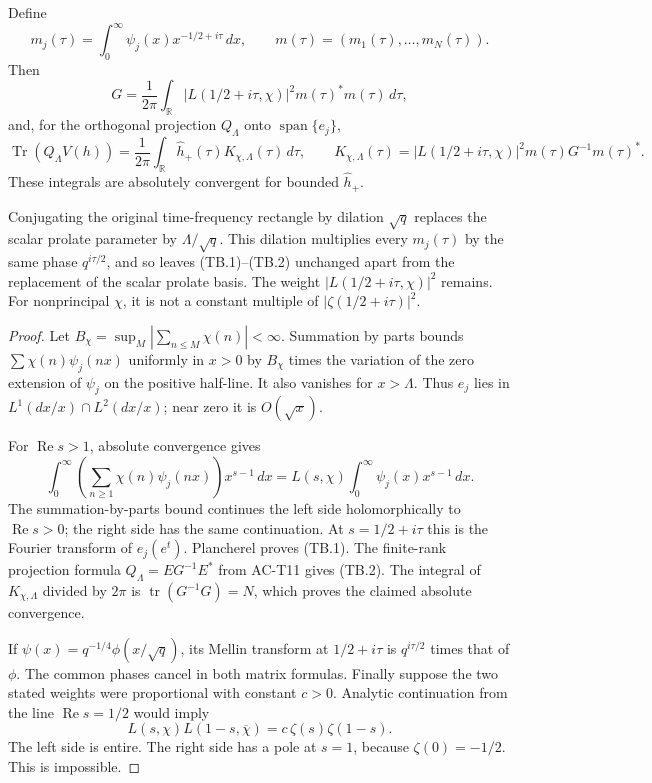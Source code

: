 \begin{proposition}
\label{AC-T21}
Define
\[
 m_j(\tau)=\int_0^\infty
       \psi_j(x)x^{-1/2+i\tau}\,dx,\qquad
 m(\tau)=(m_1(\tau),\ldots,m_N(\tau)).
\]
Then
\[
 G=\frac1{2\pi}\int_{\mathbb R}
      |L(1/2+i\tau,\chi)|^2 m(\tau)^*m(\tau)\,d\tau,
 \tag{TB.1}
\]
and, for the orthogonal projection \(Q_\Lambda\) onto
\(\operatorname{span}\{e_j\}\),
\[
 \operatorname{Tr}(Q_\Lambda V(h))
   =\frac1{2\pi}\int_{\mathbb R}\widehat h_+(\tau)
       K_{\chi,\Lambda}(\tau)\,d\tau,\qquad
 K_{\chi,\Lambda}(\tau)=
 |L(1/2+i\tau,\chi)|^2
           m(\tau)G^{-1}m(\tau)^* .
 \tag{TB.2}
\]
These integrals are absolutely convergent for bounded
\(\widehat h_+\).

Conjugating the original time-frequency rectangle by dilation
\(\sqrt q\) replaces the scalar prolate parameter by
\(\Lambda/\sqrt q\).  This dilation multiplies every \(m_j(\tau)\)
by the same phase \(q^{i\tau/2}\), and so leaves (TB.1)--(TB.2)
unchanged apart from the replacement of the scalar prolate basis.
The weight \(|L(1/2+i\tau,\chi)|^2\) remains.
For nonprincipal \(\chi\), it is not a constant multiple of
\(|\zeta(1/2+i\tau)|^2\).
\end{proposition}
\begin{proof}
Let \(B_\chi=\sup_M|\sum_{n\leq M}\chi(n)|<\infty\).
Summation by parts bounds
\(\sum\chi(n)\psi_j(nx)\) uniformly in \(x>0\) by
\(B_\chi\) times the variation of the zero extension of
\(\psi_j\) on the positive half-line.
It also vanishes for \(x>\Lambda\).
Thus \(e_j\) lies in \(L^1(dx/x)\cap L^2(dx/x)\);
near zero it is \(O(\sqrt x)\).

For \(\operatorname{Re}s>1\), absolute convergence gives
\[
 \int_0^\infty\left(\sum_{n\geq1}\chi(n)\psi_j(nx)\right)
                      x^{s-1}\,dx
       =L(s,\chi)\int_0^\infty\psi_j(x)x^{s-1}\,dx.
\]
The summation-by-parts bound continues the left side
holomorphically to \(\operatorname{Re}s>0\); the right side
has the same continuation.  At \(s=1/2+i\tau\) this is the
Fourier transform of \(e_j(e^t)\).
Plancherel proves (TB.1).  The finite-rank projection formula
\(Q_\Lambda=EG^{-1}E^*\) from AC-T11 gives (TB.2).
The integral of \(K_{\chi,\Lambda}\) divided by \(2\pi\) is
\(\operatorname{tr}(G^{-1}G)=N\), which proves the claimed
absolute convergence.

If \(\psi(x)=q^{-1/4}\phi(x/\sqrt q)\), its Mellin
transform at \(1/2+i\tau\) is \(q^{i\tau/2}\) times that of
\(\phi\).  The common phases cancel in both matrix formulas.
Finally suppose the two stated weights were proportional
with constant \(c>0\).  Analytic continuation from the line
\(\operatorname{Re}s=1/2\) would imply
\[
 L(s,\chi)L(1-s,\overline\chi)
       =c\,\zeta(s)\zeta(1-s).
\]
The left side is entire.  The right side has a pole at \(s=1\),
because \(\zeta(0)=-1/2\).  This is impossible.
\end{proof}

